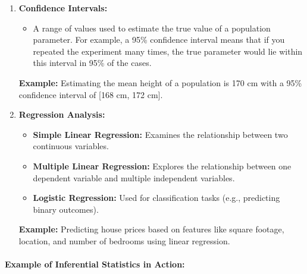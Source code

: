 \documentclass[12pt]{book}
\providecommand{\tightlist}{%
  \setlength{\itemsep}{0pt}\setlength{\parskip}{0pt}}
\begin{document}
\begin{enumerate}
  \textbf{Key Concepts in Hypothesis Testing:}

  \begin{itemize}
  \tightlist
  \item
    \textbf{P-value:} The probability of observing the test results
    under the null hypothesis. A small p-value (typically less than
    0.05) indicates that you should reject the null hypothesis.
  \item
    \textbf{Type I Error:} Rejecting the null hypothesis when it is
    actually true (false positive).
  \item
    \textbf{Type II Error:} Failing to reject the null hypothesis when
    it is actually false (false negative).
  \end{itemize}
\item
  \textbf{Confidence Intervals:}

  \begin{itemize}
  \tightlist
  \item
    A range of values used to estimate the true value of a population
    parameter. For example, a 95\% confidence interval means that if you
    repeated the experiment many times, the true parameter would lie
    within this interval in 95\% of the cases.
  \end{itemize}

  \textbf{Example:} Estimating the mean height of a population is 170 cm
  with a 95\% confidence interval of {[}168 cm, 172 cm{]}.
\item
  \textbf{Regression Analysis:}

  \begin{itemize}
  \tightlist
  \item
    \textbf{Simple Linear Regression:} Examines the relationship between
    two continuous variables.
  \item
    \textbf{Multiple Linear Regression:} Explores the relationship
    between one dependent variable and multiple independent variables.
  \item
    \textbf{Logistic Regression:} Used for classification tasks (e.g.,
    predicting binary outcomes).
  \end{itemize}

  \textbf{Example:} Predicting house prices based on features like
  square footage, location, and number of bedrooms using linear
  regression.
\end{enumerate}

\paragraph{\texorpdfstring{\textbf{Example of Inferential Statistics in
Action:}}{Example of Inferential Statistics in Action:}}\label{example-of-inferential-statistics-in-action}
\end{document}
